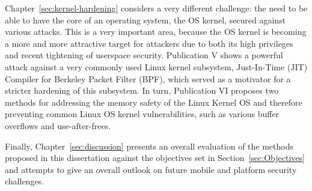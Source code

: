 Chapter~\ref{sec:kernel-hardening} considers a very different challenge: the need to be able to have the core of an operating system, the OS kernel, secured against various attacks. This is a very important area, because the OS kernel is becoming a more and more attractive target for attackers due to both its high privileges and recent tightening of userspace security. Publication V shows a powerful attack against a very commonly used Linux kernel subsystem, Just-In-Time (JIT) Compiler for Berkeley Packet Filter (BPF), which served as a motivator for a stricter hardening of this subsystem. In turn, Publication VI proposes two methods for addressing the memory safety of the Linux Kernel OS and therefore preventing common Linux OS kernel vulnerabilities, such as various buffer overflows and use-after-frees. 

Finally, Chapter~\ref{sec:discussion} presents an overall evaluation of the methods proposed in this dissertation against the objectives set in Section~\ref{sec:Objectives} and attempts to give an overall outlook on future mobile and platform security challenges. 

